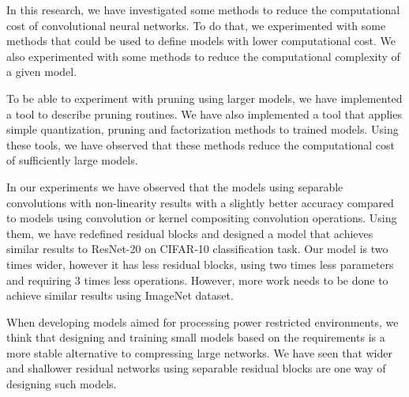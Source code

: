 
\iffalse
    What is the strongest and most important statement that you can make from your observations? 
    If you met the reader at a meeting six months from now, what do you want them to remember about your paper? 
    Refer back to problem posed, and describe the conclusions that you reached from carrying out this investigation, summarize new observations, new interpretations, and new insights that have resulted from the present work.
    Include the broader implications of your results. 
    Do not repeat word for word the abstract, introduction or discussion.
\fi

In this research, we have investigated some methods to reduce the computational cost of convolutional neural networks. To do that, we experimented with some methods that could be used to define models with lower computational cost. We also experimented with some methods to reduce the computational complexity of a given model. 

To be able to experiment with pruning using larger models, we have implemented a tool to describe pruning routines. We have also implemented a tool that applies simple quantization, pruning and factorization methods to trained models. Using these tools, we have observed that these methods reduce the computational cost of sufficiently large models.

In our experiments we have observed that the models using separable convolutions with non-linearity results with a slightly better accuracy compared to models using convolution or kernel compositing convolution operations. Using them, we have redefined residual blocks and designed a model that achieves similar results to ResNet-20 on CIFAR-10 classification task. Our model is two times wider, however it has less residual blocks, using two times less parameters and requiring 3 times less operations. However, more work needs to be done to achieve similar results using ImageNet dataset.

When developing models aimed for processing power restricted environments, we think that designing and training small models based on the requirements is a more stable alternative to compressing large networks. We have seen that wider and shallower residual networks using separable residual blocks are one way of designing such models.

